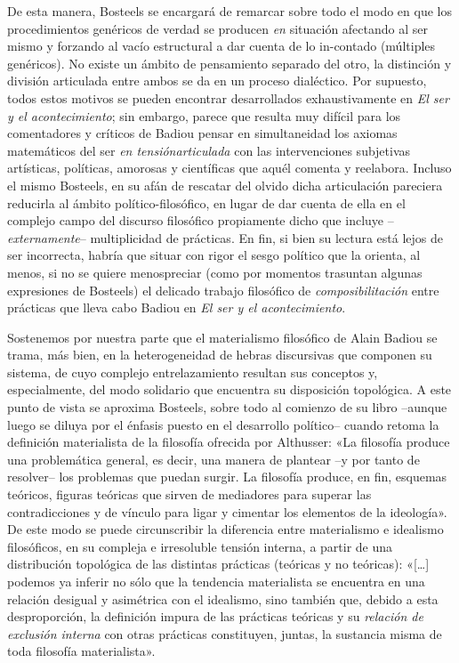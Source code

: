 De esta manera, Bosteels se encargará de remarcar sobre todo el modo en que los procedimientos genéricos de verdad se producen \emph{en} situación afectando al ser mismo y forzando al vacío estructural a dar cuenta de lo in-contado (múltiples genéricos). No existe un ámbito de pensamiento separado del otro, la distinción y división articulada entre ambos se da en un proceso dialéctico. Por supuesto, todos estos motivos se pueden encontrar desarrollados exhaustivamente en \emph{El ser y el acontecimiento}; sin embargo, parece que resulta muy difícil para los comentadores y críticos de Badiou pensar en simultaneidad los axiomas matemáticos del ser \emph{en tensiónarticulada} con las intervenciones subjetivas artísticas, políticas, amorosas y científicas que aquél comenta y reelabora. Incluso el mismo Bosteels, en su afán de rescatar del olvido dicha articulación pareciera reducirla al ámbito político-filosófico, en lugar de dar cuenta de ella en el complejo campo del discurso filosófico propiamente dicho que incluye --\emph{externamente}-- multiplicidad de prácticas. En fin, si bien su lectura está lejos de ser incorrecta, habría que situar con rigor el sesgo político que la orienta, al menos, si no se quiere menospreciar (como por momentos trasuntan algunas expresiones de Bosteels) el delicado trabajo filosófico de \emph{composibilitación} entre prácticas que lleva cabo Badiou en \emph{El ser y el acontecimiento}.

Sostenemos por nuestra parte que el materialismo filosófico de Alain Badiou se trama, más bien, en la heterogeneidad de hebras discursivas que componen su sistema, de cuyo complejo entrelazamiento resultan sus conceptos y, especialmente, del modo solidario que encuentra su disposición topológica. A este punto de vista se aproxima Bosteels, sobre todo al comienzo de su libro --aunque luego se diluya por el énfasis puesto en el desarrollo político-- cuando retoma la definición materialista de la filosofía ofrecida por Althusser: «La filosofía produce una problemática general, es decir, una manera de plantear --y por tanto de resolver-- los problemas que puedan surgir. La filosofía produce, en fin, esquemas teóricos, figuras teóricas que sirven de mediadores para superar las contradicciones y de vínculo para ligar y cimentar los elementos de la ideología». De este modo se puede circunscribir la diferencia entre materialismo e idealismo filosóficos, en su compleja e irresoluble tensión interna, a partir de una distribución topológica de las distintas prácticas (teóricas y no teóricas): «{[}\ldots{]} podemos ya inferir no sólo que la tendencia materialista se encuentra en una relación desigual y asimétrica con el idealismo, sino también que, debido a esta desproporción, la definición impura de las prácticas teóricas y su \emph{relación de exclusión interna} con otras prácticas constituyen, juntas, la sustancia misma de toda filosofía materialista».

